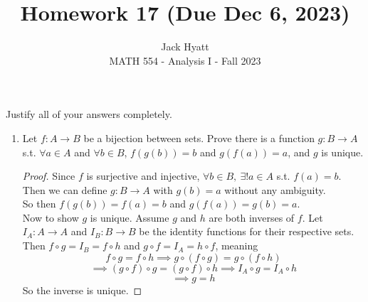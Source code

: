 \documentclass[14pt]{extarticle}
\begin{document}
	
	
	
	\title{Homework 17 (Due Dec 6, 2023)}
	\author{Jack Hyatt\\ %
		MATH 554 - Analysis I - Fall 2023} 
	
	\maketitle
	
	Justify all of your answers completely.\\
	
	
	\medskip 
	
	\begin{enumerate}
		\item Let $f:A \rightarrow B$ be a bijection between sets. Prove there is a function $g:B \rightarrow A$ s.t. $\forall a \in A$ and $\forall b \in B$, $f(g(b))=b$ and $g(f(a))=a$, and $g$ is unique.
		\begin{proof}
			Since $f$ is surjective and injective, $\forall b \in B,\ \exists! a \in A$ s.t. $f(a) = b$. Then we can define $g:B \rightarrow A$ with $g(b) = a$ without any ambiguity.\\
			So then $f(g(b)) = f(a) = b$ and $g(f(a)) = g(b) = a$.\\
			Now to show $g$ is unique. Assume $g$ and $h$ are both inverses of $f$. Let $I_A:A \rightarrow A$ and $I_B:B \rightarrow B$ be the identity functions for their respective sets.\\
			Then $f \circ g = I_B = f \circ h$ and $g \circ f = I_A = h \circ f$, meaning \[f \circ g = f \circ h \implies g \circ (f \circ g) = g \circ (f \circ h)\]
			\[\implies (g \circ f) \circ g = (g \circ f) \circ h \implies I_A \circ g = I_A \circ h \]
			\[\implies g = h\]
			So the inverse is unique.
		\end{proof}
		

\end{enumerate}
\end{document}
